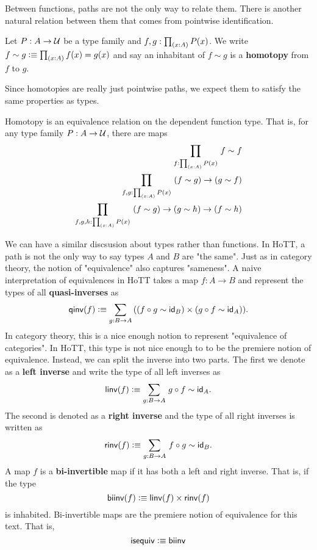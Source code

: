 \documentclass[main.tex]{subfiles}
\begin{document}
Between functions, paths are not the only way to relate them. There is another natural relation between them that comes from
pointwise identification.
\begin{definition}
    Let $P : A \to \mathcal{U}$ be a type family and $f,g : \prd{x : A}P(x)$. We write
    $f\sim g \defeq \prd{x : A} f(x) = g(x) $
    and say an inhabitant of $f \sim g$ is a \textbf{homotopy} from $f$ to $g$.
\end{definition}
Since homotopies are really just pointwise paths, we expect them to satisfy the same properties as types. 
\begin{lemma}
    Homotopy is an equivalence relation on the dependent function type. That is, for any type family $P : A \to \mathcal{U}$, there are maps
    \begin{align*}
        \prd{f : \prd{x : A}P(x)} f \sim f\\
        \prd{f,g : \prd{x:A}P(x)} \left ( f \sim g \right ) \to \left ( g \sim f \right )\\
        \prd{f,g,h : \prd{x : A} P(x)} \left ( f \sim g \right ) \to \left ( g \sim h \right ) \to \left (f \sim h\right )
    \end{align*}
\end{lemma}
We can have a similar discsusion about types rather than functions. In HoTT, a path is not the only way to say types $A$ and $B$ are
"the same". Just as in category theory, the notion of "equivalence" also captures "sameness". A naive interpretation of equivalences
in HoTT takes a map $f : A \to B$ and represent the types of all \textbf{quasi-inverses} as
\[
    \qinv(f) \defeq \sm{g : B \to A}((f\circ g \sim \id{B})\times(g \circ f \sim \id{A})).
\]    
In category theory, this is a nice enough notion to represent "equivalence of categories". In HoTT, this type is not nice enough to 
to be the premiere notion of equivalence. Instead, we can split the inverse into two parts. The first we denote
as a \textbf{left inverse} and write the type of all left inverses as 
\begin{equation*}
    \linv(f) \defeq \sm{g : B \to A}g \circ f \sim \id{A}.
\end{equation*}
The second is denoted as a \textbf{right inverse} and the type of all right inverses is written as
\begin{equation*}
    \rinv(f) \defeq \sm{g : B \to A} f \circ g \sim \id{B}.
\end{equation*}
A map $f$ is a \textbf{bi-invertible} map if it has both a left and right inverse. That is, if the type
\begin{equation*}
\normalfont \mathsf{biinv}(f) \vcentcolon\equiv \normalfont \mathsf{linv}(f) \times \normalfont \mathsf{rinv}(f)
\end{equation*}
is inhabited. Bi-invertible maps are the premiere notion of equivalence for this text. That is,
\begin{equation*}
    \normalfont \mathsf{isequiv} \vcentcolon\equiv \normalfont \mathsf{biinv}
\end{equation*}
\end{document}
